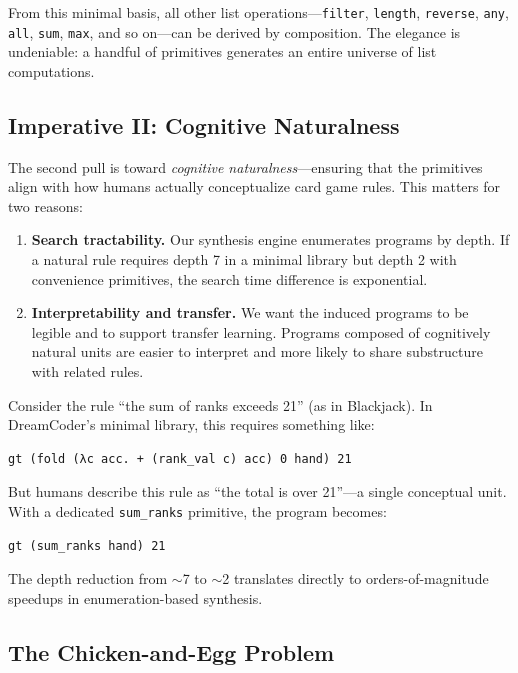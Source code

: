 \documentclass[11pt]{article}
\begin{document}
From this minimal basis, all other list operations---\texttt{filter}, \texttt{length}, \texttt{reverse}, \texttt{any}, \texttt{all}, \texttt{sum}, \texttt{max}, and so on---can be derived by composition. The elegance is undeniable: a handful of primitives generates an entire universe of list computations.

\subsection{Imperative II: Cognitive Naturalness}

The second pull is toward \emph{cognitive naturalness}---ensuring that the primitives align with how humans actually conceptualize card game rules. This matters for two reasons:

\begin{enumerate}
    \item \textbf{Search tractability.} Our synthesis engine enumerates programs by depth. If a natural rule requires depth 7 in a minimal library but depth 2 with convenience primitives, the search time difference is exponential.
    
    \item \textbf{Interpretability and transfer.} We want the induced programs to be legible and to support transfer learning. Programs composed of cognitively natural units are easier to interpret and more likely to share substructure with related rules.
\end{enumerate}

Consider the rule ``the sum of ranks exceeds 21'' (as in Blackjack). In DreamCoder's minimal library, this requires something like:

\begin{lstlisting}[style=dsl]
gt (fold (λc acc. + (rank_val c) acc) 0 hand) 21
\end{lstlisting}

\noindent But humans describe this rule as ``the total is over 21''---a single conceptual unit. With a dedicated \texttt{sum\_ranks} primitive, the program becomes:

\begin{lstlisting}[style=dsl]
gt (sum_ranks hand) 21
\end{lstlisting}

\noindent The depth reduction from $\sim$7 to $\sim$2 translates directly to orders-of-magnitude speedups in enumeration-based synthesis.

\subsection{The Chicken-and-Egg Problem}
\end{document}
